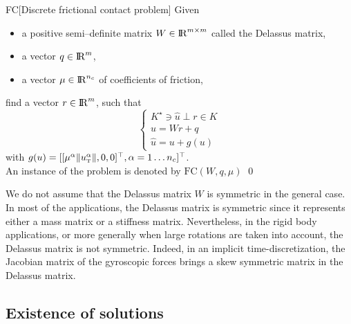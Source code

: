 {\begin{problemenv}{FC}[Discrete frictional contact problem]\label{prob:II}
  Given
  \begin{itemize}
    \item a positive semi--definite  matrix ${W} \in \mathrm{I\!R}^{m \times m}$ called the Delassus matrix,
    \item a vector $ {q} \in \mathrm{I\!R}^m$,
    \item a vector $\mu \in \mathrm{I\!R}^{n_c}$ of coefficients of friction, 
  \end{itemize}
find  a vector $r\in \mathrm{I\!R}^m$, such that
\begin{equation}\label{eq:soccp2}
  \begin{cases}
   K^\star \ni {\hat u} \perp r \in K \\[2mm]
    u =Wr +q \\[2mm]
    \hat u =u + g(u)
  \end{cases}
\end{equation}
with $g(u) = [[\mu^\alpha  \|u^\alpha_{\hbox{\tiny{T}}}\|, 0, 0 ]^\top, \alpha = 1\ldots n_c]^\top$. \\
An instance of the problem is denoted by $\mathrm{FC}(W,q,\mu)$
\qed
\end{problemenv}
%

\begin{remark}
  \label{Re:symmetry}
  We do not assume that the Delassus matrix $W$ is symmetric in the general case. In most of the applications, the Delassus matrix is symmetric since it represents either a mass matrix or a stiffness matrix. Nevertheless, in the rigid body applications, or more generally when large rotations are taken into account, the Delassus matrix is not symmetric. Indeed, in an implicit time-discretization, the Jacobian matrix of the gyroscopic forces brings a skew symmetric matrix in the Delassus matrix. 
\end{remark}

%




\subsection{Existence of solutions}
\label{sec:existence}

}

